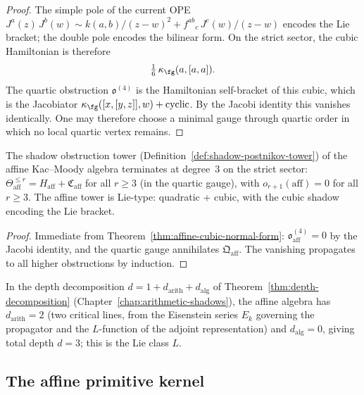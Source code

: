 \begin{proof}
The simple pole of the current OPE
$J^a(z)\,J^b(w) \sim k(a,b)/(z-w)^2 + f^{ab}{}_c\,J^c(w)/(z-w)$
encodes the Lie bracket; the double pole encodes the bilinear
form. On the strict sector, the cubic Hamiltonian is therefore
\[
\tfrac{1}{6}\,\kappa_{\fg}(a,[a,a]).
\]
The quartic obstruction $\mathfrak{o}^{(4)}$ is the Hamiltonian
self-bracket of this cubic, which is the Jacobiator
$\kappa_{\fg}([x,[y,z]], w) + \mathrm{cyclic}$. By the Jacobi
identity this vanishes identically. One may therefore choose a
minimal gauge through quartic order in which no local quartic
vertex remains.
\end{proof}

\begin{corollary}
\label{cor:affine-postnikov-termination}
The shadow obstruction tower
\textup{(}Definition~\textup{\ref{def:shadow-postnikov-tower})}
of the affine Kac--Moody algebra terminates at degree~$3$
on the strict sector:
$\Theta_{\mathrm{aff}}^{\leq r} =
H_{\mathrm{aff}} + \mathfrak{C}_{\mathrm{aff}}$
for all $r \geq 3$ \textup{(}in the quartic gauge\textup{)},
with $o_{r+1}(\mathrm{aff}) = 0$ for all $r \geq 3$.
The affine tower is Lie-type: quadratic + cubic, with the
cubic shadow encoding the Lie bracket.
\end{corollary}

\begin{proof}
Immediate from Theorem~\ref{thm:affine-cubic-normal-form}:
$\mathfrak{o}_{\mathrm{aff}}^{(4)} = 0$ by the Jacobi
identity, and the quartic gauge annihilates
$\mathfrak{Q}_{\mathrm{aff}}$.
The vanishing propagates to all higher obstructions by induction.
\end{proof}

\begin{remark}
\label{rem:affine-arithmetic-depth}
In the depth decomposition $d = 1 + d_{\mathrm{arith}} + d_{\mathrm{alg}}$
of Theorem~\ref{thm:depth-decomposition} (Chapter~\ref{chap:arithmetic-shadows}),
the affine algebra has $d_{\mathrm{arith}} = 2$ (two critical lines,
from the Eisenstein series $E_k$ governing the propagator and the
$L$-function of the adjoint representation) and $d_{\mathrm{alg}} = 0$,
giving total depth $d = 3$; this is the Lie class $L$.
\end{remark}

\subsection{The affine primitive kernel}
\label{subsec:affine-primitive-kernel}

